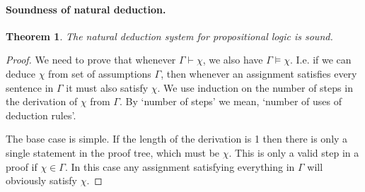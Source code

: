 \documentclass{article}
\theoremstyle{plain}
\newtheorem{theorem}{Theorem}[section]{\bfseries}{\itshape}
\begin{document}
\paragraph{Soundness of natural deduction.}    
\begin{theorem}\label{T:sound}
The natural deduction system for propositional logic is sound.
\end{theorem}
\begin{proof}
We need to prove that whenever $\Gamma\vdash \chi$, we also have $\Gamma\models \chi$. I.e. if we can deduce $\chi$ from set of assumptions $\Gamma$, then whenever an assignment satisfies every sentence in $\Gamma$ it must also satisfy $\chi$. We use induction on the number of steps in the derivation of $\chi$ from $\Gamma$. By `number of steps' we mean, `number of uses of deduction rules'. 

The base case is simple. If the length of the derivation is 1 then there is only a single statement in the proof tree, which must be $\chi$. This is only a valid step in a proof if $\chi\in\Gamma$. In this case any assignment satisfying everything in $\Gamma$ will obviously satisfy $\chi$.


\end{proof}
\end{document}
